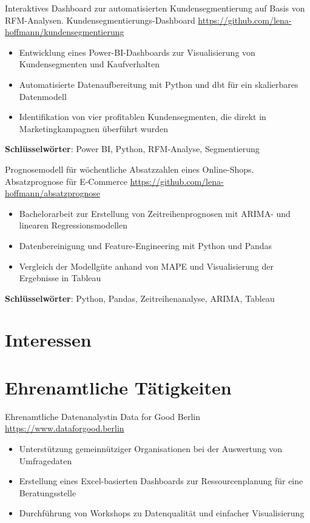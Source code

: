 \documentclass[a4paper, serif, 10pt]{moderncv}
\begin{document}
        {Interaktives Dashboard zur automatisierten Kundensegmentierung auf Basis von RFM-Analysen.}
        {Kundensegmentierungs-Dashboard}
        {\url{https://github.com/lena-hoffmann/kundensegmentierung}}
        {}
        {\begin{itemize}
\item Entwicklung eines Power-BI-Dashboards zur Visualisierung von Kundensegmenten und Kaufverhalten
\item Automatisierte Datenaufbereitung mit Python und dbt für ein skalierbares Datenmodell
\item Identifikation von vier profitablen Kundensegmenten, die direkt in Marketingkampagnen überführt wurden
\end{itemize}
\textbf{Schlüsselwörter}: Power BI, Python, RFM-Analyse, Segmentierung}

        {Prognosemodell für wöchentliche Absatzzahlen eines Online-Shops.}
        {Absatzprognose für E-Commerce}
        {\url{https://github.com/lena-hoffmann/absatzprognose}}
        {}
        {\begin{itemize}
\item Bachelorarbeit zur Erstellung von Zeitreihenprognosen mit ARIMA- und linearen Regressionsmodellen
\item Datenbereinigung und Feature-Engineering mit Python und Pandas
\item Vergleich der Modellgüte anhand von MAPE und Visualisierung der Ergebnisse in Tableau
\end{itemize}
\textbf{Schlüsselwörter}: Python, Pandas, Zeitreihenanalyse, ARIMA, Tableau}
\section{Interessen}

\section{Ehrenamtliche Tätigkeiten}

        {Ehrenamtliche Datenanalystin}
        {Data for Good Berlin}
        {\url{https://www.dataforgood.berlin}}
        {}
        {\begin{itemize}
\item Unterstützung gemeinnütziger Organisationen bei der Auswertung von Umfragedaten
\item Erstellung eines Excel-basierten Dashboards zur Ressourcenplanung für eine Beratungsstelle
\item Durchführung von Workshops zu Datenqualität und einfacher Visualisierung
\end{itemize}}
    
\end{document}
